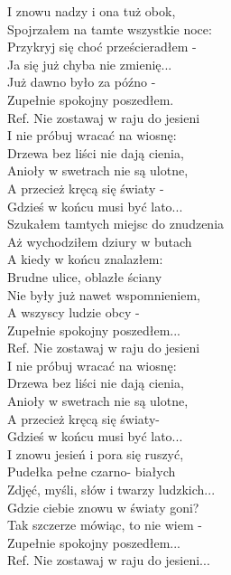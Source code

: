 
\begin{flushleft}
I znowu nadzy i ona tuż obok, \tab{} \\
Spojrzałem na tamte wszystkie noce: \\
Przykryj się choć prześcieradłem -\\
Ja się już chyba nie zmienię... \tab{}\\
Już dawno było za późno - \tab{}\\
Zupełnie spokojny poszedłem. \tab{}\\
\vskip 3mm
Ref. Nie zostawaj w raju do jesieni \\
\hspace{0.9cm}I nie próbuj wracać na wiosnę: \\
\hspace{0.9cm}Drzewa bez liści nie dają cienia, \\
\hspace{0.9cm}Anioły w swetrach nie są ulotne, \\
\hspace{0.9cm}A przecież kręcą się światy - \\
\hspace{0.9cm}Gdzieś w końcu musi być lato... \\
\vskip 3mm
Szukałem tamtych miejsc do znudzenia \\
Aż wychodziłem dziury w butach \\
A kiedy w końcu znalazłem: \\
Brudne ulice, oblazłe ściany \\
Nie były już nawet wspomnieniem, \\
A wszyscy ludzie obcy - \\
Zupełnie spokojny poszedłem... \\
\vskip 3mm
Ref. Nie zostawaj w raju do jesieni\\
\hspace{0.9cm}I nie próbuj wracać na wiosnę: \\
\hspace{0.9cm}Drzewa bez liści nie dają cienia, \\
\hspace{0.9cm}Anioły w swetrach nie są ulotne, \\
\hspace{0.9cm}A przecież kręcą się światy- \\
\hspace{0.9cm}Gdzieś w końcu musi być lato... \\
\vskip 3mm
I znowu jesień i pora się ruszyć, \\
Pudełka pełne czarno- białych \\
Zdjęć, myśli, słów i twarzy ludzkich... \\
Gdzie ciebie znowu w światy goni? \\
Tak szczerze mówiąc, to nie wiem - \\
Zupełnie spokojny poszedłem...  \\
\vskip 3mm
Ref. Nie zostawaj w raju do jesieni...\\
\end{flushleft}
\clearpage
